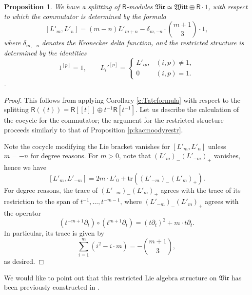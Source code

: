 \documentclass{amsart}
\newtheorem{Prop}[Thm]{Proposition}
\theoremstyle{definition}
\newcommand{\on}{\mathrm}
\newcommand{\Ring}{\mathsf{R}}
\numberwithin{equation}{section}
\begin{document}
\begin{Prop} We have a splitting of $\Ring$-modules $\mathfrak{Vir} \simeq \mathfrak{Witt} \oplus \Ring \cdot 1$, with respect to which the commutator is determined by the formula 
$$[L'_m , L'_n] = (m-n) L'_{m+n}  -  \delta_{m, -n} \cdot \binom{m+1}{3}  \cdot 1,$$
where $\delta_{m, -n}$ denotes the Kronecker delta function, and the restricted structure is determined by the identities $$1^{[p]} = 1, \quad \quad L_i'^{[p]} = \begin{cases} L'_{ip}, & (i,p) \neq 1, \\ 0 & (i,p) = 1. \end{cases}$$. \end{Prop}


\begin{proof} This follows from applying Corollary \ref{c:Tateformula} with respect to the splitting $\Ring(\!(t)\!) = \Ring[[t]] \oplus t^{-1} \Ring[t^{-1}].$ Let us describe the calculation of the cocycle for the commutator; the argument for the restricted structure proceeds similarly to that of Proposition \ref{p:kacmoodyrestr}. 

 Note the cocycle modifying the Lie bracket vanishes for $[L'_m, L'_n]$ unless $m = -n$ for degree reasons. For $m > 0$, note that $(L'_m)_- (L'_{-m})_+$ vanishes, hence we have 
 $$[L'_m, L'_{-m}] = 2m \cdot L'_0 +  \on{tr}( (L'_{-m})_- (L'_m)_+).$$
For degree reasons, the trace of $(L'_{-m})_- (L'_m)_+$ agrees with the trace of its restriction to the span of $t^{-1}, \ldots, t^{-m-1}$, where $(L'_{-m})_- (L'_m)_+$ agrees with the operator 
$$(t^{-m+1} \partial_t) \circ (t^{m+1} \partial_t) = (t \partial_t)^2 + m  \cdot t \partial_t.$$In particular, its trace is given by 
$$\sum_{i = 1}^m (i^2 - i \cdot m) = - \binom{m+1}{3},$$
as desired. 
\end{proof}

We would like to point out that this restricted Lie algebra structure on $\mathfrak{Vir}$ has been previously constructed in \cite{JLM}.
\end{document}
